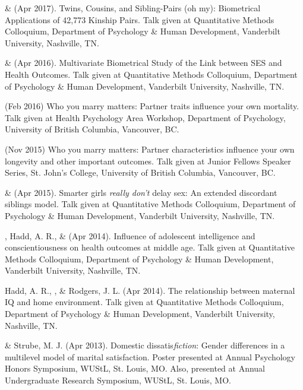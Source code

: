 \item\meb \& \Joe (Apr 2017). Twins, Cousins, and Sibling-Pairs (oh my): Biometrical Applications of 42,773 Kinship Pairs. Talk given at Quantitative Methods Colloquium, Department of Psychology \& Human Development, Vanderbilt University, Nashville, TN.
\item\meb \& \Joe (Apr 2016). Multivariate Biometrical Study of the Link between SES and Health Outcomes. Talk given at Quantitative Methods Colloquium, Department of Psychology \& Human Development, Vanderbilt University, Nashville, TN.
\item \meb (Feb 2016) Who you marry matters: Partner traits influence your own mortality. Talk given at Health Psychology Area Workshop, Department of Psychology, University of British Columbia, Vancouver, BC.
\item \meb (Nov 2015) Who you marry matters: Partner characteristics influence your own longevity and other important outcomes. Talk given at Junior Fellows Speaker Series, St. John's College, University of British Columbia, Vancouver, BC.
\item\meb \& \Joe (Apr 2015). Smarter girls \textit{really don't} delay sex: An extended discordant siblings model. Talk given at Quantitative Methods Colloquium, Department of Psychology \& Human Development, Vanderbilt University, Nashville, TN.
\item\meb, Hadd, A. R., \& \Joe (Apr 2014). Influence of adolescent intelligence and conscientiousness on health outcomes at middle age. Talk given at Quantitative Methods Colloquium, Department of Psychology \& Human Development, Vanderbilt University, Nashville, TN.
\item Hadd, A. R., \meb, \& Rodgers, J. L. (Apr 2014). The relationship between maternal IQ and home environment. Talk given at Quantitative Methods Colloquium, Department of Psychology \& Human Development, Vanderbilt University, Nashville, TN.
\item\meb \& Strube, M. J. (Apr 2013). Domestic dissatis{\em fiction}: Gender differences in a multilevel model of marital satisfaction. Poster presented at Annual Psychology Honors Symposium, WUStL, St. Louis, MO. Also, presented at Annual Undergraduate Research Symposium, WUStL, St. Louis, MO.